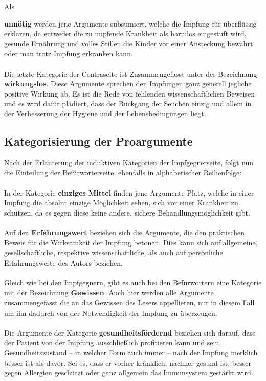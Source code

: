 \documentclass[
    a4paper,
    12pt,
    hyphens,
    chapterprefix=true,
    headheight=33pt,
    footheight=29pt,
    headings=optiontohead, %
]{scrartcl}
\begin{document}
Als {\textbf{unnötig} werden jene Argumente subsumiert, welche die Impfung für überflüssig erklären, da entweder die zu impfende Krankheit als harmlos eingestuft wird, gesunde Ernährung und volles Stillen die Kinder vor einer Ansteckung bewahrt oder man trotz Impfung erkranken kann.\\
\\
Die letzte Kategorie der Contraseite ist Zusammengefasst unter der Bezeichnung \textbf{wirkungslos}. Diese Argumente sprechen den Impfungen ganz generell jegliche positive Wirkung ab. Es ist die Rede von fehlenden wissenschaftlichen Beweisen und es wird  dafür plädiert, dass der Rückgang der Seuchen einzig und allein in der Verbesserung der Hygiene und der Lebensbedingungen liegt.


\subsection{Kategorisierung der Proargumente}
Nach der Erläuterung der induktiven Kategorien der Impfgegnerseite, folgt nun die Einteilung der Befürworterseite, ebenfalls in alphabetischer Reihenfolge:\\
\\
In der Kategorie \textbf{einziges Mittel} finden jene Argumente Platz, welche in einer Impfung die absolut einzige Möglichkeit sehen, sich vor einer Krankheit zu schützen, da es gegen diese keine andere, sichere Behandlungsmöglichkeit gibt.\\ 
\\
Auf den \textbf{Erfahrungswert} beziehen sich die Argumente, die den praktischen Beweis für die Wirksamkeit der Impfung betonen. Dies kann sich auf allgemeine, gesellschaftliche, respektive wissenschaftliche,  als auch auf persönliche Erfahrungswerte des Autors beziehen.\\ 
\\
Gleich wie bei den Impfgegnern, gibt es auch bei den Befürwortern eine Kategorie mit der Bezeichnung \textbf{Gewissen}. Auch hier werden alle Argumente zusammengefasst die an das Gewissen des Lesers appellieren, nur in diesem Fall um ihn dadurch von der Notwendigkeit der Impfung zu überzeugen.\\
\\
Die Argumente der Kategorie \textbf{gesundheitsfördernd} beziehen sich darauf, dass der Patient von der Impfung ausschließlich profitieren kann und sein Gesundheitszustand -- in welcher Form auch immer -- nach der Impfung merklich besser ist als davor. Sei es, dass er vorher kränklich, nachher gesund ist, besser gegen Allergien geschützt oder ganz allgemein das Immunsystem gestärkt wird.\\
}
\end{document}
